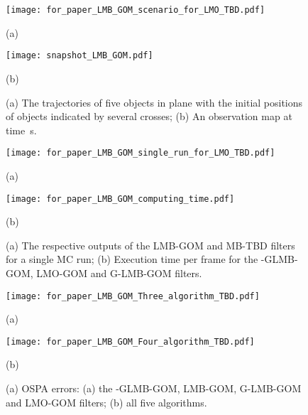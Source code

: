 \documentclass[journal]{IEEEtran}
\begin{document}
{   \begin{figure}[ht]
\setlength{\abovecaptionskip}{-7pt}
\setlength{\belowcaptionskip}{-7pt}
\begin{minipage}[b]{0.48\linewidth}
  \centering
\centerline{\texttt{[image: for\_paper\_LMB\_GOM\_scenario\_for\_LMO\_TBD.pdf]}}
\centerline{\small{\small{(a)}} }\medskip
\end{minipage}
\hfill
\begin{minipage}[b]{0.48\linewidth}
  \centering
  \centerline{\texttt{[image: snapshot\_LMB\_GOM.pdf]}}
\centerline{\small{\small{(b)}}}\medskip
\end{minipage}
\caption{(a) The trajectories of five objects in  plane with the initial positions of objects indicated by several crosses; (b) An observation map  at time \,s.\label{fig: scenario and observation map}}
\end{figure}
\begin{figure}[ht]
\begin{minipage}[b]{0.49\linewidth}
  \centering
\centerline{\texttt{[image: for\_paper\_LMB\_GOM\_single\_run\_for\_LMO\_TBD.pdf]}}
\centerline{\small{\small{(a)}} }\medskip
\end{minipage}
\hfill
\begin{minipage}[b]{0.49\linewidth}
  \centering
\centerline{\texttt{[image: for\_paper\_LMB\_GOM\_computing\_time.pdf]}}
\centerline{\small{\small{(b)}}}\medskip
\end{minipage}
\caption{ (a) The respective outputs   of the LMB-GOM and MB-TBD filters for a single MC run; (b)  Execution time per frame for the -GLMB-GOM, LMO-GOM and G-LMB-GOM filters.\label{fig: computing time and single-run output}}
\end{figure}
   \begin{figure}[ht]
\setlength{\abovecaptionskip}{-7pt}
\setlength{\belowcaptionskip}{-7pt}
\begin{minipage}[b]{0.48\linewidth}
  \centering
\centerline{\texttt{[image: for\_paper\_LMB\_GOM\_Three\_algorithm\_TBD.pdf]}}
\centerline{\small{\small{(a)}} }\medskip
\end{minipage}
\hfill
\begin{minipage}[b]{0.48\linewidth}
  \centering
\centerline{\texttt{[image: for\_paper\_LMB\_GOM\_Four\_algorithm\_TBD.pdf]}}
\centerline{\small{\small{(b)}}}\medskip
\end{minipage}
\caption{(a) OSPA errors: (a) the -GLMB-GOM, LMB-GOM, G-LMB-GOM and LMO-GOM filters; (b) all five algorithms.}
  \label{fig: performance of five targets}
\end{figure}

}
\end{document}
